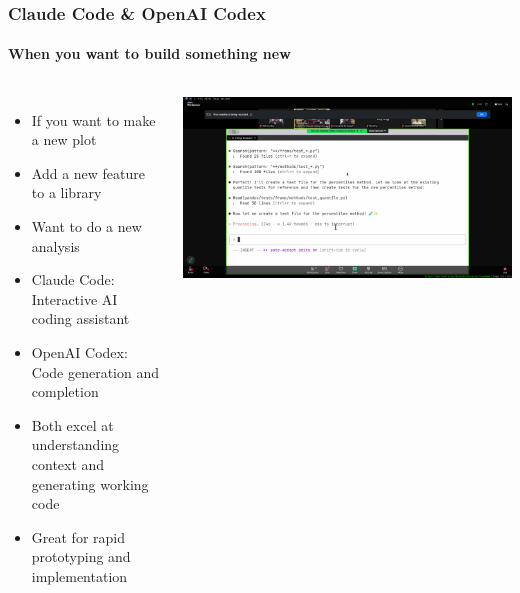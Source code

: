 \documentclass[aspectratio=169]{beamer}
\begin{document}
\begin{frame}
    \frametitle{Claude Code \& OpenAI Codex}
    \framesubtitle{When you want to build something new}
    
    \begin{columns}
        \begin{itemize}
            \item If you want to make a new plot
            \item Add a new feature to a library
            \item Want to do a new analysis
            \item Claude Code: Interactive AI coding assistant
            \item OpenAI Codex: Code generation and completion
            \item Both excel at understanding context and generating working code
            \item Great for rapid prototyping and implementation
        \end{itemize}
        
        \includegraphics[width=\textwidth]{figures/claude_code_screenshot.png}
    \end{columns}
\end{frame}
\end{document}
